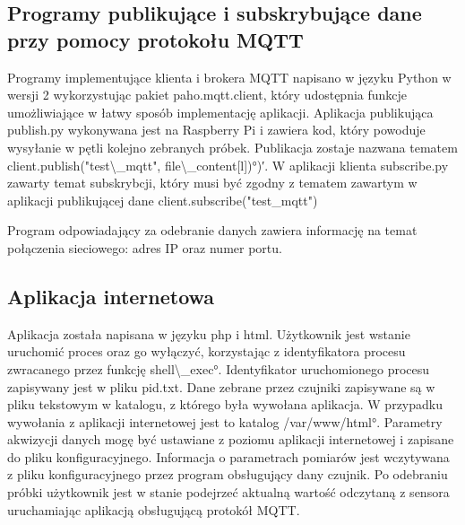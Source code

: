 \subsection{Programy publikujące i subskrybujące dane przy pomocy protokołu MQTT}

Programy implementujące klienta i brokera MQTT napisano w języku Python w wersji 2 wykorzystując pakiet paho.mqtt.client, który udostępnia funkcje umożliwiające w łatwy sposób implementację aplikacji. 
Aplikacja publikująca publish.py wykonywana jest na Raspberry Pi i zawiera kod, który powoduje wysyłanie w pętli kolejno zebranych próbek. Publikacja zostaje nazwana tematem 
\ang{client.publish("test\_mqtt", file\_content[l]);)}.
W aplikacji klienta subscribe.py zawarty temat subskrybcji, który musi być zgodny z tematem zawartym w aplikacji publikującej dane\cite{paho.mqtt}
client.subscribe("test\_mqtt")

Program odpowiadający za odebranie danych zawiera informację na temat połączenia sieciowego: adres IP oraz numer portu.

\subsection{Aplikacja internetowa}

Aplikacja została napisana w języku php i html. Użytkownik jest wstanie uruchomić proces oraz go wyłączyć, korzystając z identyfikatora procesu zwracanego przez funkcję  \ang{shell\_exec}. Identyfikator uruchomionego procesu zapisywany jest w pliku pid.txt. Dane zebrane przez czujniki zapisywane są w pliku tekstowym w katalogu, z którego była wywołana aplikacja. W przypadku wywołania z aplikacji internetowej jest to katalog \ang{/var/www/html}. Parametry akwizycji danych mogę być ustawiane z poziomu aplikacji internetowej i zapisane do pliku konfiguracyjnego. Informacja o parametrach pomiarów jest wczytywana z pliku konfiguracyjnego przez program obsługujący dany czujnik. Po odebraniu próbki użytkownik jest w stanie podejrzeć aktualną wartość odczytaną z sensora uruchamiając aplikacją obsługującą protokół MQTT. 

